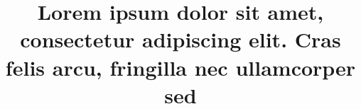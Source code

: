 \documentclass[conference]{IEEEtran}
\begin{document}
\title{Lorem ipsum dolor sit amet, consectetur adipiscing elit. Cras felis arcu, fringilla nec ullamcorper sed}









\end{document}

